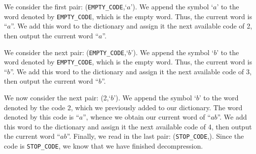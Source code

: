 \documentclass{article}
\begin{document}
We consider the first pair: (\texttt{EMPTY\_CODE},\;`$a$'). We append the symbol
`$a$' to the word denoted by \texttt{EMPTY\_CODE}, which is the empty word.
Thus, the current word is ``$a$''. We add this word to the dictionary and assign
it the next available code of 2, then output the current word ``$a$''.

We consider the next pair: (\texttt{EMPTY\_CODE},\;`$b$'). We append the symbol
`$b$' to the word denoted by \texttt{EMPTY\_CODE}, which is the empty word.
Thus, the current word is ``$b$''. We add this word to the dictionary and assign
it the next available code of 3, then output the current word ``$b$''.

We now consider the next pair: (2,\;`$b$'). We append the symbol `$b$' to the
word denoted by the code 2, which we previously added to our dictionary. The
word denoted by this code is ``$a$'', whence we obtain our current word of
``$ab$''. We add this word to the dictionary and assign it the next available
code of 4, then output the current word ``$ab$''. Finally, we read in the last
pair: (\texttt{STOP\_CODE},). Since the code is \texttt{STOP\_CODE}, we know
that we have finished decompression.
\end{document}
